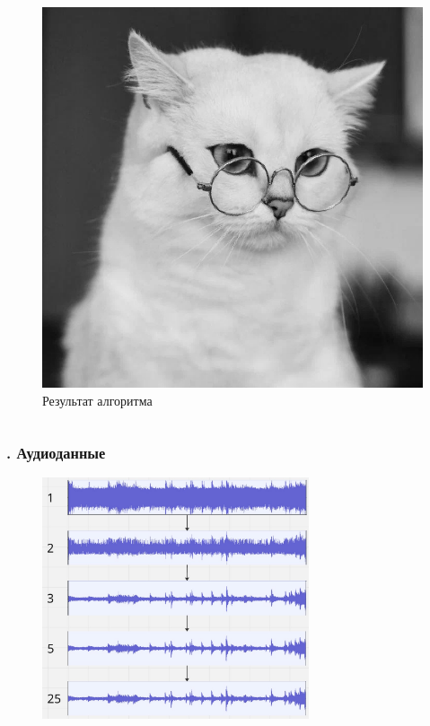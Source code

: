\documentclass[t aspectratio=169]{beamer}
\begin{document}
\begin{frame}
\begin{columns}
\begin{figure}
\begin{center}
          \includegraphics[width=1\textwidth]{./images/catr2.jpg}
          \caption{Результат алгоритма}
        \end{center}
      \end{figure}
    \normalsize
    \end{columns}
  \end{frame}

  \begin{frame}\frametitle{\insertsection . Аудиоданные}
      \begin{figure}
        \begin{center}
          \includegraphics[width=0.7\textwidth]{./images/ms_stages.jpg}
        \end{center}
      \end{figure}
  \end{frame}
\end{document}
